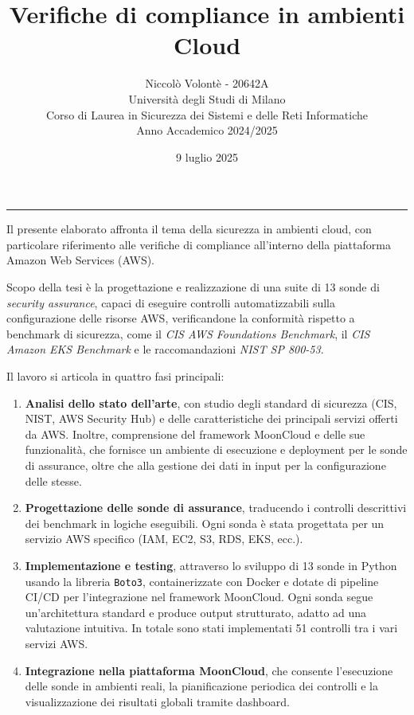 \documentclass[11pt,a4paper]{article}
\title{\bfseries Verifiche di compliance in ambienti Cloud}
\author{Niccolò Volontè - 20642A\\
\normalsize Università degli Studi di Milano\\
\normalsize Corso di Laurea in Sicurezza dei Sistemi e delle Reti Informatiche\\
\normalsize Anno Accademico 2024/2025}
\date{9 luglio 2025}
\begin{document}
\maketitle
\vspace{1em}
\hrule
\vspace{1em}
Il presente elaborato affronta il tema della sicurezza in ambienti cloud, con particolare riferimento alle verifiche di compliance all'interno della piattaforma Amazon Web Services (AWS). 

Scopo della tesi è la progettazione e realizzazione di una suite di 13 sonde di \emph{security assurance}, capaci di eseguire controlli automatizzabili sulla configurazione delle risorse AWS, verificandone la conformità rispetto a benchmark di sicurezza, come il \emph{CIS AWS Foundations Benchmark}, il \emph{CIS Amazon EKS Benchmark} e le raccomandazioni \emph{NIST SP 800-53}.

Il lavoro si articola in quattro fasi principali:

\begin{enumerate}
  \item \textbf{Analisi dello stato dell'arte}, con studio degli standard di sicurezza (CIS, NIST, AWS Security Hub) e delle caratteristiche dei principali servizi offerti da AWS. Inoltre, comprensione del framework MoonCloud e delle sue funzionalità, che fornisce un ambiente di esecuzione e deployment per le sonde di assurance, oltre che alla gestione dei dati in input per la configurazione delle stesse.
  
  \item \textbf{Progettazione delle sonde di assurance}, traducendo i controlli descrittivi dei benchmark in logiche eseguibili. Ogni sonda è stata progettata per un servizio AWS specifico (IAM, EC2, S3, RDS, EKS, ecc.).
  
  \item \textbf{Implementazione e testing}, attraverso lo sviluppo di 13 sonde in Python usando la libreria \texttt{Boto3}, containerizzate con Docker e dotate di pipeline CI/CD per l'integrazione nel framework MoonCloud. Ogni sonda segue un'architettura standard e produce output strutturato, adatto ad una valutazione intuitiva. In totale sono stati implementati 51 controlli tra i vari servizi AWS.
  
  \item \textbf{Integrazione nella piattaforma MoonCloud}, che consente l'esecuzione delle sonde in ambienti reali, la pianificazione periodica dei controlli e la visualizzazione dei risultati globali tramite dashboard.
\end{enumerate}
\end{document}
